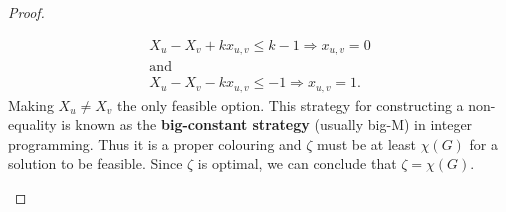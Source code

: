 \begin{proposition}
\begin{proof}
\begin{enumerate}
\begin{enumerate}
\begin{align*}
X_u-X_v + kx_{u,v}\leq k-1 \Rightarrow x_{u,v} = 0\\
\text{and}\\
X_u-X_v - kx_{u,v}\leq -1 \Rightarrow x_{u,v} = 1.
\end{align*}
Making $X_u \neq X_v$ the only feasible option. This strategy for constructing a non-equality is known as the \textbf{big-constant strategy} (usually big-M) in integer programming. Thus it is a proper colouring and $\zeta$ must be at least $\chi (G)$ for a solution to be feasible. Since $\zeta$ is optimal, we can conclude that $\zeta = \chi (G)$.
\end{enumerate}
\end{enumerate}
\end{proof}
\end{proposition}
